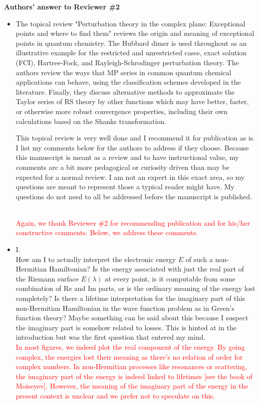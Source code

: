 \documentclass[10pt]{letter}
\newcommand{\alert}[1]{\textcolor{red}{#1}}
\begin{document}
\begin{letter}
\begin{itemize}
\end{itemize}

\noindent \textbf{\large Authors' answer to Reviewer \#2}

\begin{itemize}

	\item 
	{The topical review "Perturbation theory in the complex plane: Exceptional points and where to find them" reviews the origin and meaning of exceptional points in quantum chemistry. 
	The Hubbard dimer is used throughout as an illustrative example for the restricted and unrestricted cases, exact solution (FCI), Hartree-Fock, and Rayleigh-Schrodinger perturbation theory. 
	The authors review the ways that MP series in common quantum chemical applications can behave, using the classification schemes developed in the literature. 
	Finally, they discuss alternative methods to approximate the Taylor series of RS theory by other functions which may have better, faster, or otherwise more robust convergence properties, including their own calculations based on the Shanks transformation.

	This topical review is very well done and I recommend it for publication as is. 
	I list my comments below for the authors to address if they choose. 
	Because this manuscript is meant as a review and to have instructional value, my comments are a bit more pedagogical or curiosity driven than may be expected for a normal review. 
	I am not an expert in this exact area, so my questions are meant to represent those a typical reader might have. 
	My questions do not need to all be addressed before the manuscript is published.}
	\\
	\alert{Again, we thank Reviewer \#2 for recommending publication and for his/her constructive comments.
	Below, we address these comments.}

\item 
	{I.\\
	How am I to actually interpret the electronic energy $E$ of such a non-Hermitian Hamiltonian? 
	Is the energy associated with just the real part of the Riemann surface $E(\lambda)$ at every point, is it computable from some combination of Re and Im parts, or is the ordinary meaning of the energy lost completely? 
	Is there a lifetime interpretation for the imaginary part of this non-Hermitian Hamiltonian in the wave function problem as in Green's function theory? 
	Maybe something can be said about this because I suspect the imaginary part is somehow related to losses. 
	This is hinted at in the introduction but was the first question that entered my mind.}
	\\
	\alert{In most figures, we indeed plot the real component of the energy.
	By going complex, the energies lost their meaning as there's no relation of order for complex numbers.
	In non-Hermitian processes like resonances or scattering, the imaginary part of the energy is indeed linked to lifetimes [see the book of Moiseyev].
	However, the meaning  of the imaginary part of the energy in the present context is unclear and we prefer not to speculate on this.}


\end{itemize}
\end{letter}
\end{document}
